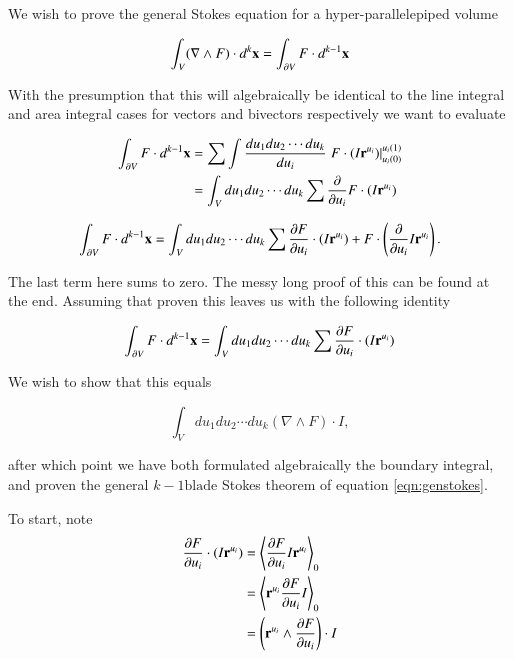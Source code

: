\documentclass{article}
\newcommand{\grad}[0]{\nabla}
\newcommand{\PD}[2]{\frac{\partial {#2}}{\partial {#1}}}
\newcommand{\gpgrade}[2] {{\left\langle{{#1}}\right\rangle}_{#2}}
\newcommand{\gpgradezero}[1] {\gpgrade{#1}{0}}
\begin{document}
We wish to prove the general Stokes equation for a hyper-parallelepiped volume

\begin{equation}\label{eqn:genstokes}
\int_V (\grad \wedge F) \cdot d^{k}\Bx = \int_{\partial V} F \cdot d^{k-1}\Bx 
\end{equation}

With the presumption that this will algebraically be identical to the line integral and area integral cases for vectors and bivectors respectively
we want to evaluate

\begin{align*}
\int_{\partial V} F \cdot d^{k-1}\Bx 
&= \sum \int \frac{du_1 du_2 \cdots du_k}{du_i} \left.{F \cdot (I \Br^{u_i})}\right\vert_{u_i(0)}^{u_i(1)} \\
&= \int_V du_1 du_2 \cdots du_k \sum \PD{u_i}{} F \cdot (I \Br^{u_i}) \\
\end{align*}

\begin{equation}\label{eqn:toprove}
\int_{\partial V} F \cdot d^{k-1}\Bx 
= \int_V du_1 du_2 \cdots du_k \sum \PD{u_i}{F} \cdot (I \Br^{u_i}) +F \cdot \left( \PD{u_i}{} I \Br^{u_i} \right).
\end{equation}

The last term here sums to zero.  The messy long proof of this can be found at the end.  Assuming that proven this leaves us with the following identity

\begin{equation}\label{eqn:toprove2}
\int_{\partial V} F \cdot d^{k-1}\Bx 
= \int_V du_1 du_2 \cdots du_k \sum \PD{u_i}{F} \cdot (I \Br^{u_i})
\end{equation}

We wish to show that this equals

\begin{equation*}
\int_V du_1 du_2 \cdots du_k (\grad \wedge F) \cdot I,
\end{equation*}

after which point we have both formulated algebraically the boundary integral, and proven the general $k-1\text{blade}$ Stokes theorem of equation \ref{eqn:genstokes}.

To start, note
\begin{align*}
\PD{u_i}{F} \cdot (I \Br^{u_i})
&= \gpgradezero{\PD{u_i}{F} I \Br^{u_i}} \\
&= \gpgradezero{ \Br^{u_i} \PD{u_i}{F} I } \\
&= \left(\Br^{u_i} \wedge \PD{u_i}{F} \right) \cdot I \\
\end{align*}
\end{document}
